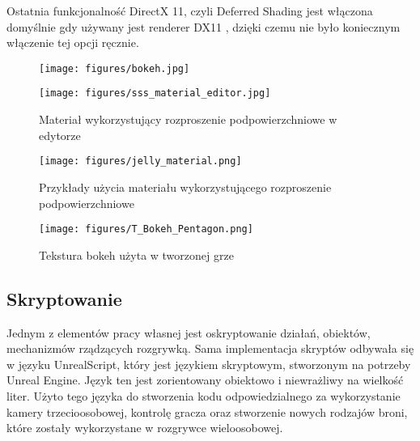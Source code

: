 Ostatnia funkcjonalność DirectX 11, czyli Deferred Shading jest włączona domyślnie gdy używany jest renderer DX11 \cite{udk_deferred_shading}, dzięki czemu nie było koniecznym włączenie tej opcji ręcznie.

\begin{figure}
\begin{center}
\texttt{[image: figures/bokeh.jpg]}
\label{bokeh_example}
\end{center}
\end{figure}

\begin{figure}
\begin{center}
\texttt{[image: figures/sss\_material\_editor.jpg]}
\caption{Materiał wykorzystujący rozproszenie podpowierzchniowe w edytorze}
\label{sss_material_editor}
\end{center}
\end{figure}

\begin{figure}
\begin{center}
\texttt{[image: figures/jelly\_material.png]}
\caption{Przykłady użycia materiału wykorzystującego rozproszenie podpowierzchniowe}
\label{sss_material_example}
\end{center}
\end{figure}

\begin{figure}
\begin{center}
\texttt{[image: figures/T\_Bokeh\_Pentagon.png]}
\caption{Tekstura bokeh użyta w tworzonej grze}
\label{bokeh_texture}
\end{center}
\end{figure}

\subsection{Skryptowanie}

Jednym z elementów pracy własnej jest oskryptowanie działań, obiektów, mechanizmów rządzących rozgrywką. Sama implementacja skryptów odbywała się w języku UnrealScript, który jest językiem skryptowym, stworzonym na potrzeby Unreal Engine. Język ten jest zorientowany obiektowo i niewrażliwy na wielkość liter. Użyto tego języka do stworzenia kodu odpowiedzialnego za wykorzystanie kamery trzecioosobowej, kontrolę gracza oraz stworzenie nowych rodzajów broni, które zostały wykorzystane w rozgrywce wieloosobowej.

